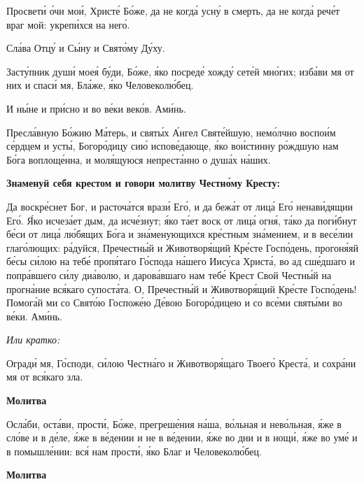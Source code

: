    Просвети́ о́чи мои́, Христе́ Бо́же, да не когда́ усну́ в смерть, да не когда́
рече́т враг мой: укрепи́хся на него́.


   Сла́ва Отцу́ и Сы́ну и Свято́му Ду́ху.


   Засту́пник души́ моея́ бу́ди, Бо́же, я́ко посреде́ хожду́ сете́й мно́гих;
изба́ви мя от них и спаси́ мя, Бла́же, я́ко Человеколю́бец.


   И ны́не и при́сно и во ве́ки веко́в. Ами́нь.


   Пресла́вную Бо́жию Ма́терь, и святы́х А́нгел Святе́йшую, немо́лчно
воспои́м се́рдцем и усты́, Богоро́дицу сию́ испове́дающе, я́ко вои́стинну
ро́ждшую нам Бо́га воплоще́нна, и моля́щуюся непреста́нно о душа́х
на́ших.



 

\bfseries Знаменуй себя крестом и говори молитву Честно́му Кресту:\normalfont{}


   Да воскре́снет Бог, и расточа́тся врази́ Его́, и да бежа́т от лица́ Его́
ненави́дящии Его́. Я́ко исчеза́ет дым, да исче́знут; я́ко та́ет воск от лица́
огня́, та́ко да поги́бнут бе́си от лица́ лю́бящих Бо́га и зна́менующихся
кре́стным зна́мением, и в весе́лии глаго́лющих: ра́дуйся, Пречестны́й и
Животворя́щий Кре́сте Госпо́день, прогоня́яй бе́сы си́лою на тебе́ пропя́таго
Го́спода на́шего Иису́са Христа́, во ад сше́дшаго и попра́вшего си́лу диа́волю,
и дарова́вшаго нам тебе́ Крест Свой Честны́й на прогна́ние вся́каго
супоста́та. О, Пречестны́й и Животворя́щий Кре́сте Госпо́день! Помога́й ми
со Свято́ю Госпоже́ю Де́вою Богоро́дицею и со все́ми святы́ми во ве́ки.
Ами́нь.


 \itshape Или кратко:\normalfont{}


   Огради́ мя, Го́споди, си́лою Честна́го и Животворя́щаго Твоего́ Креста́, и
сохра́ни мя от вся́каго зла.



 

\bfseries Молитва\normalfont{}


   Осла́би, оста́ви, прости́, Бо́же, прегреше́ния на́ша, во́льная и нево́льная,
я́же в сло́ве и в де́ле, я́же в ве́дении и не в ве́дении, я́же во дни и
в нощи́, я́же во уме́ и в помышле́нии: вся́ нам прости́, я́ко Благ и
Человеколю́бец.



 

\bfseries Молитва\normalfont{}


